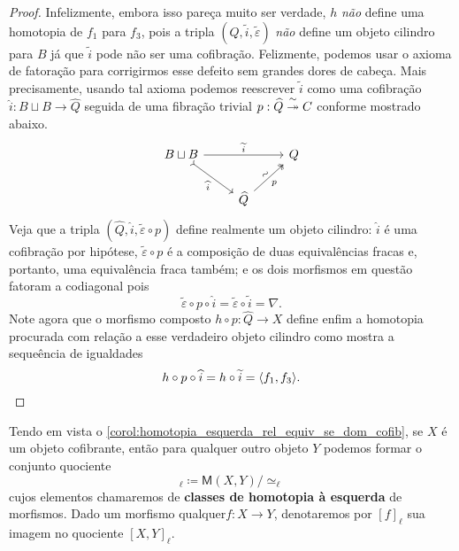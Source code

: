 \begin{proof}
  Infelizmente, embora isso pareça muito ser verdade, $h$ \emph{não} define uma homotopia de $f_{1}$ para $f_{3}$, pois a tripla $(Q,\widetilde{i},\widetilde{\varepsilon})$ \emph{não} define um objeto cilindro para $B$ já que $\widetilde{i}$ pode não ser uma cofibração.
  Felizmente, podemos usar o axioma de fatoração para corrigirmos esse defeito sem grandes dores de cabeça.
  Mais precisamente, usando tal axioma podemos reescrever $\widetilde{i}$ como uma cofibração $\widehat{i}: B \sqcup B \to \widehat{Q}$ seguida de uma fibração trivial $p: \widehat{Q} \overset{\sim}{\twoheadrightarrow} C$ conforme mostrado abaixo.
  \begin{displaymath}
    \begin{tikzcd}
      B \sqcup B
      \arrow[rr, "\widetilde{i}"]
      \arrow[rd, tail, "\widehat{i}" swap]
      & & Q
      \\ & \widehat{Q}
      \arrow[ru, two heads, "\sim" {sloped}, "p" {swap}]
    \end{tikzcd}
  \end{displaymath}
  Veja que a tripla $(\widehat{Q},\widehat{i},\widetilde{\varepsilon} \circ p)$ define realmente um objeto cilindro: $\widehat{i}$ é uma cofibração por hipótese, $\widetilde{\varepsilon} \circ p$ é a composição de duas equivalências fracas e, portanto, uma equivalência fraca também; e os dois morfismos em questão fatoram a codiagonal pois
  \begin{displaymath}
    \widetilde{\varepsilon} \circ p \circ \widehat{i} = \widetilde{\varepsilon} \circ \widetilde{i} = \nabla.
  \end{displaymath}
  Note agora que o morfismo composto $h \circ p: \widehat{Q} \to X$ define enfim a homotopia procurada com relação a esse verdadeiro objeto cilindro como mostra a sequeência de igualdades
  \begin{displaymath}
    h \circ p \circ \widehat{i} = h \circ \widetilde{i} = \langle f_{1},f_{3} \rangle. \qedhere
  \end{displaymath}
\end{proof}

Tendo em vista o \cref{corol:homotopia_esquerda_rel_equiv_se_dom_cofib}, se $X$ é um objeto cofibrante, então para qualquer outro objeto $Y$ podemos formar o conjunto quociente
\begin{displaymath}
  [X,Y]_{\ell} \coloneqq \mathsf{M}(X,Y)/\simeq_{\ell}
\end{displaymath}
cujos elementos chamaremos de \textbf{classes de homotopia à esquerda} de morfismos.
Dado um morfismo qualquer$f: X \to Y$, denotaremos por $[f]_{\ell}$ sua imagem no quociente $[X,Y]_{\ell}$.

